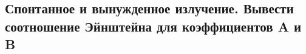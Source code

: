 \subsection{Спонтанное и вынужденное излучение. Вывести соотношение Эйнштейна для коэффициентов
A и B}

